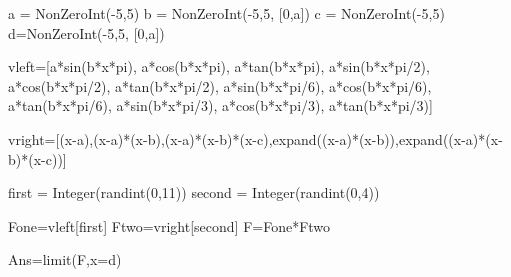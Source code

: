 

\begin{sagesilent}
a = NonZeroInt(-5,5)
b = NonZeroInt(-5,5, [0,a])
c = NonZeroInt(-5,5)
d=NonZeroInt(-5,5, [0,a])
   
vleft=[a*sin(b*x*pi), a*cos(b*x*pi), a*tan(b*x*pi), a*sin(b*x*pi/2), a*cos(b*x*pi/2), a*tan(b*x*pi/2), a*sin(b*x*pi/6), a*cos(b*x*pi/6), a*tan(b*x*pi/6), a*sin(b*x*pi/3), a*cos(b*x*pi/3), a*tan(b*x*pi/3)]

vright=[(x-a),(x-a)*(x-b),(x-a)*(x-b)*(x-c),expand((x-a)*(x-b)),expand((x-a)*(x-b)*(x-c))]

first = Integer(randint(0,11))
second = Integer(randint(0,4))

Fone=vleft[first]
Ftwo=vright[second]
F=Fone*Ftwo

Ans=limit(F,x=d)

\end{sagesilent}


